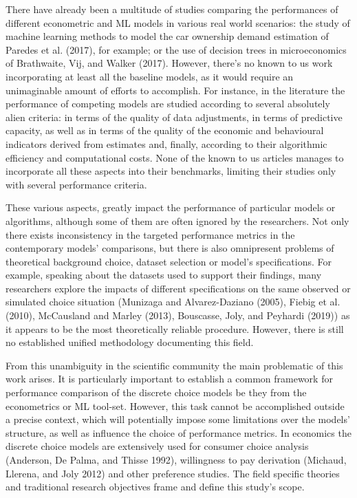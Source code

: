 \documentclass[12pt,]{article}
\begin{document}
There have already been a multitude of studies comparing the
performances of different econometric and ML models in various real
world scenarios: the study of machine learning methods to model the car
ownership demand estimation of Paredes et al. (2017), for example; or
the use of decision trees in microeconomics of Brathwaite, Vij, and
Walker (2017). However, there's no known to us work incorporating at
least all the baseline models, as it would require an unimaginable
amount of efforts to accomplish. For instance, in the literature the
performance of competing models are studied according to several
absolutely alien criteria: in terms of the quality of data adjustments,
in terms of predictive capacity, as well as in terms of the quality of
the economic and behavioural indicators derived from estimates and,
finally, according to their algorithmic efficiency and computational
costs. None of the known to us articles manages to incorporate all these
aspects into their benchmarks, limiting their studies only with several
performance criteria.

These various aspects, greatly impact the performance of particular
models or algorithms, although some of them are often ignored by the
researchers. Not only there exists inconsistency in the targeted
performance metrics in the contemporary models' comparisons, but there
is also omnipresent problems of theoretical background choice, dataset
selection or model's specifications. For example, speaking about the
datasets used to support their findings, many researchers explore the
impacts of different specifications on the same observed or simulated
choice situation (Munizaga and Alvarez-Daziano (2005), Fiebig et al.
(2010), McCausland and Marley (2013), Bouscasse, Joly, and Peyhardi
(2019)) as it appears to be the most theoretically reliable procedure.
However, there is still no established unified methodology documenting
this field.

From this unambiguity in the scientific community the main problematic
of this work arises. It is particularly important to establish a common
framework for performance comparison of the discrete choice models be
they from the econometrics or ML tool-set. However, this task cannot be
accomplished outside a precise context, which will potentially impose
some limitations over the models' structure, as well as influence the
choice of performance metrics. In economics the discrete choice models
are extensively used for consumer choice analysis (Anderson, De Palma,
and Thisse 1992), willingness to pay derivation (Michaud, Llerena, and
Joly 2012) and other preference studies. The field specific theories and
traditional research objectives frame and define this study's scope.
\end{document}
